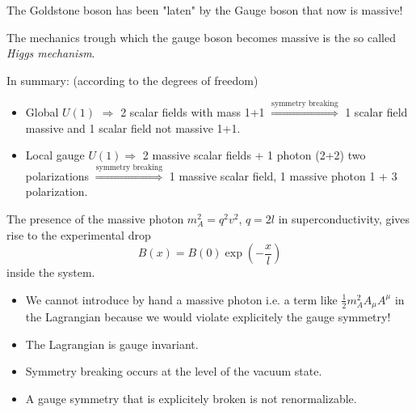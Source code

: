 \documentclass[../main/main.tex]{subfiles}
\begin{document}
The Goldstone boson has been "laten" by the Gauge boson that now is massive!

The mechanics trough which the gauge boson becomes massive is the so called \emph{Higgs mechanism}.

In summary: (according to the degrees of freedom)
\begin{itemize}
\item Global \( U(1) \)  \( \Rightarrow  \) 2 scalar fields with mass 1+1 \( \overset{\text{symmetry breaking}}{\Longrightarrow}\)  1 scalar field massive and 1 scalar field not massive 1+1.
\item Local gauge \( U(1) \)\( \Rightarrow  \) 2 massive scalar fields + 1 photon (2+2) two polarizations  \( \overset{\text{symmetry breaking}}{\Longrightarrow}  \) 1 massive scalar field, 1 massive photon 1 + 3 polarization.
\end{itemize}
\begin{remark}
The presence of the massive photon \( m^2_A = q^2 v^2 \), \( q = 2 l \) in superconductivity, gives rise to the experimental drop
\begin{equation}
  B (x) = B(0) \exp (- \frac{x}{l})
\end{equation}
inside the system.
\end{remark}
\begin{itemize}
\item We cannot introduce by hand a massive photon i.e. a term like \( \frac{1}{2} m_A^2 A_ \mu A ^\mu  \) in the Lagrangian because we would violate explicitely the gauge symmetry!

\item The Lagrangian is gauge invariant.
\item Symmetry breaking occurs at the level of the vacuum state.
\item A gauge symmetry that is explicitely broken is not renormalizable. 
\end{itemize}
\end{document}
